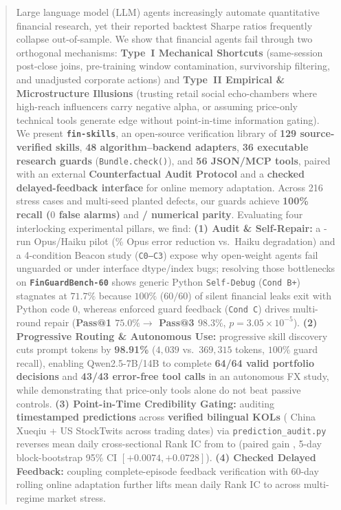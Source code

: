 \begin{abstract}
Large language model (LLM) agents increasingly automate quantitative financial research, yet their reported backtest Sharpe ratios frequently collapse out-of-sample. We show that financial agents fail through two orthogonal mechanisms: \textbf{Type~I Mechanical Shortcuts} (same-session post-close joins, pre-training window contamination, survivorship filtering, and unadjusted corporate actions) and \textbf{Type~II Empirical \& Microstructure Illusions} (trusting retail social echo-chambers where high-reach influencers carry negative alpha, or assuming price-only technical tools generate edge without point-in-time information gating). We present \textbf{\texttt{fin-skills}}, an open-source verification library of \textbf{129 source-verified skills}, \textbf{48 algorithm--backend adapters}, \textbf{36 executable research guards} (\texttt{Bundle.check()}), and \textbf{56 JSON/MCP tools}, paired with an external \textbf{Counterfactual Audit Protocol} and a \textbf{checked delayed-feedback interface} for online memory adaptation. Across 216 stress cases and \DefectInstances{} multi-seed planted defects, our guards achieve \textbf{100\% recall ($0$ false alarms)} and \textbf{\ParityPassed{}/\ParityTotal{} numerical parity}. Evaluating four interlocking experimental pillars, we find: \textbf{(1) Audit \& Self-Repair:} a \PilotRuns{}-run Opus/Haiku pilot (\OpusReduction{}\% Opus error reduction vs.\ Haiku degradation) and a 4-condition Beacon study (\texttt{C0--C3}) expose why open-weight agents fail unguarded or under interface dtype/index bugs; resolving those bottlenecks on \textbf{\texttt{FinGuardBench-60}} shows generic Python \texttt{Self-Debug} (\texttt{Cond B+}) stagnates at $71.7\%$ because $100\%$ ($60/60$) of silent financial leaks exit with Python code $0$, whereas enforced guard feedback (\texttt{Cond C}) drives multi-round repair (\textbf{Pass@1 $75.0\% \to$ Pass@3 $98.3\%$}, $p = 3.05 \times 10^{-5}$). \textbf{(2) Progressive Routing \& Autonomous Use:} progressive skill discovery cuts prompt tokens by \textbf{98.91\%} ($4{,}039$ vs.\ $369{,}315$ tokens, $100\%$ guard recall), enabling Qwen2.5-7B/14B to complete \textbf{64/64 valid portfolio decisions} and \textbf{43/43 error-free tool calls} in an autonomous FX study, while demonstrating that price-only tools alone do not beat passive controls. \textbf{(3) Point-in-Time Credibility Gating:} auditing \textbf{\KOLPredRows{} timestamped predictions} across \textbf{\KOLTotalAccounts{} verified bilingual KOLs} (\KOLCNCount{} China Xueqiu + \KOLUSCount{} US StockTwits across \KOLTradingDates{} trading dates) via \texttt{prediction\_audit.py} reverses mean daily cross-sectional Rank IC from \textbf{\KOLNaiveDailyIC{}} to \textbf{\KOLGatedDailyIC{}} (paired gain \textbf{\KOLPairedDiffIC{}}, 5-day block-bootstrap 95\% CI $[+0.0074, +0.0728]$). \textbf{(4) Checked Delayed Feedback:} coupling complete-episode feedback verification with 60-day rolling online adaptation further lifts mean daily Rank IC to \textbf{\KOLRollingDailyIC{}} across multi-regime market stress.
\end{abstract}

